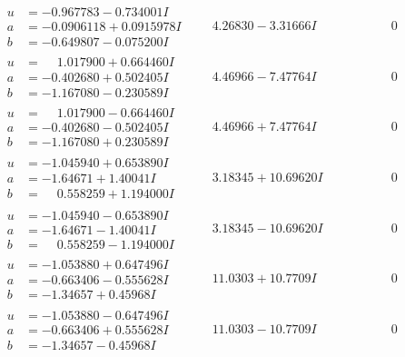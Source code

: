 \documentclass[1p]{elsarticle_modified}
\theoremstyle{definition}
\begin{document}
$$\begin{array}{c|c|c}
\begin{aligned}
u &= -0.967783 - 0.734001 I \\
a &= -0.0906118 + 0.0915978 I \\
b &= -0.649807 - 0.075200 I\end{aligned}
 & \phantom{-}4.26830 - 3.31666 I & \phantom{-0.000000 } 0 \\ \hline\begin{aligned}
u &= \phantom{-}1.017900 + 0.664460 I \\
a &= -0.402680 + 0.502405 I \\
b &= -1.167080 - 0.230589 I\end{aligned}
 & \phantom{-}4.46966 - 7.47764 I & \phantom{-0.000000 } 0 \\ \hline\begin{aligned}
u &= \phantom{-}1.017900 - 0.664460 I \\
a &= -0.402680 - 0.502405 I \\
b &= -1.167080 + 0.230589 I\end{aligned}
 & \phantom{-}4.46966 + 7.47764 I & \phantom{-0.000000 } 0 \\ \hline\begin{aligned}
u &= -1.045940 + 0.653890 I \\
a &= -1.64671 + 1.40041 I \\
b &= \phantom{-}0.558259 + 1.194000 I\end{aligned}
 & \phantom{-}3.18345 + 10.69620 I & \phantom{-0.000000 } 0 \\ \hline\begin{aligned}
u &= -1.045940 - 0.653890 I \\
a &= -1.64671 - 1.40041 I \\
b &= \phantom{-}0.558259 - 1.194000 I\end{aligned}
 & \phantom{-}3.18345 - 10.69620 I & \phantom{-0.000000 } 0 \\ \hline\begin{aligned}
u &= -1.053880 + 0.647496 I \\
a &= -0.663406 - 0.555628 I \\
b &= -1.34657 + 0.45968 I\end{aligned}
 & \phantom{-}11.0303 + 10.7709 I & \phantom{-0.000000 } 0 \\ \hline\begin{aligned}
u &= -1.053880 - 0.647496 I \\
a &= -0.663406 + 0.555628 I \\
b &= -1.34657 - 0.45968 I\end{aligned}
 & \phantom{-}11.0303 - 10.7709 I & \phantom{-0.000000 } 0 \\ \hline\begin{aligned}

\end{aligned}
\end{array}$$
\end{document}
